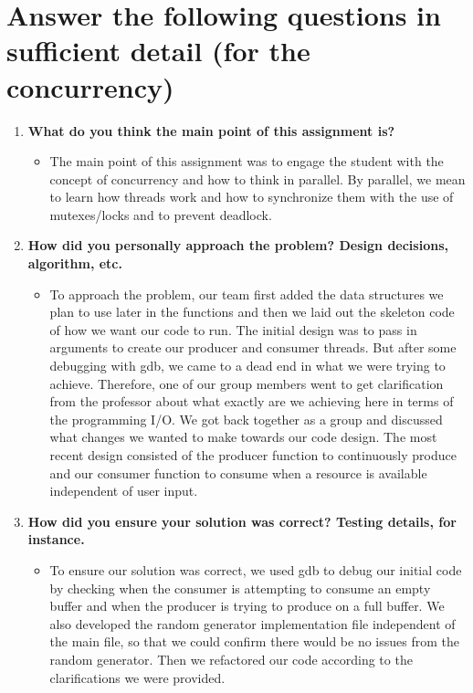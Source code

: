 \documentclass[IEEEtran,letterpaper,10pt,notitlepage,draftclsnofoot,onecolumn]{article}
\begin{document}
\section{Answer the following questions in sufficient detail (for the concurrency)}
\begin{enumerate}
\item \textbf{What do you think the main point of this assignment is?}
\begin{itemize}
\item The main point of this assignment was to engage the student 
  with the concept of concurrency and how to think in parallel. By parallel, 
  we mean to learn how threads work and how to synchronize them with the use 
  of mutexes/locks and to prevent deadlock.
\end{itemize}

\item \textbf{How did you personally approach the problem? Design decisions, algorithm, etc.}
\begin{itemize}
\item To approach the problem, our team first added the data structures 
  we plan to use later in the functions and then we laid out the skeleton 
  code of how we want our code to run. The initial design was to pass in 
  arguments to create our producer and consumer threads. But after some 
  debugging with gdb, we came to a dead end in what we were trying to 
  achieve. Therefore, one of our group members went to get clarification 
  from the professor about what exactly are we achieving here in terms 
  of the programming I/O. We got back together as a group and discussed 
  what changes we wanted to make towards our code design. The most 
  recent design consisted of the producer function to continuously 
  produce and our consumer function to consume when a resource is available
  independent of user input.
\end{itemize}

\item \textbf{How did you ensure your solution was correct? Testing details, for instance.}
\begin{itemize}
\item To ensure our solution was correct, we used gdb to debug our 
  initial code by checking when the consumer is attempting to consume 
  an empty buffer and when the producer is trying to produce on a full 
  buffer. We also developed the random generator implementation file 
  independent of the main file, so that we could confirm there would 
  be no issues from the random generator. Then we refactored our code 
  according to the clarifications we were provided.
\end{itemize}


\end{enumerate}
\end{document}
